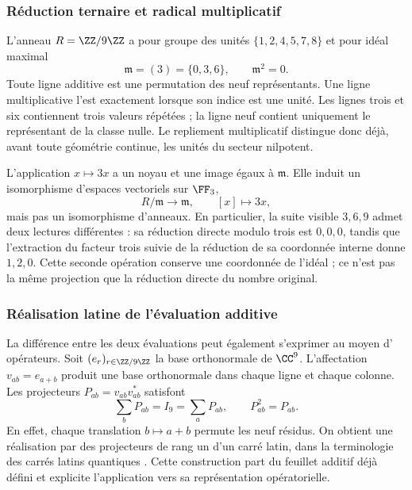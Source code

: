 \subsubsection{Réduction ternaire et radical multiplicatif}

L'anneau \(R=\ZZ/9\ZZ\) a pour groupe des unités \(\{1,2,4,5,7,8\}\) et pour idéal maximal
\[
 \mathfrak m=(3)=\{0,3,6\},\qquad\mathfrak m^2=0.
\]
Toute ligne additive est une permutation des neuf représentants. Une ligne multiplicative l'est exactement lorsque son indice est une unité. Les lignes trois et six contiennent trois valeurs répétées ; la ligne neuf contient uniquement le représentant de la classe nulle. Le repliement multiplicatif distingue donc déjà, avant toute géométrie continue, les unités du secteur nilpotent.

L'application \(x\mapsto3x\) a un noyau et une image égaux à \(\mathfrak m\). Elle induit un isomorphisme d'espaces vectoriels sur \(\FF_3\),
\[
 R/\mathfrak m\longrightarrow\mathfrak m,\qquad [x]\longmapsto3x,
\]
mais pas un isomorphisme d'anneaux. En particulier, la suite visible \(3,6,9\) admet deux lectures différentes : sa réduction directe modulo trois est \(0,0,0\), tandis que l'extraction du facteur trois suivie de la réduction de sa coordonnée interne donne \(1,2,0\). Cette seconde opération conserve une coordonnée de l'idéal ; ce n'est pas la même projection que la réduction directe du nombre original.

\subsubsection{Réalisation latine de l'évaluation additive}

La différence entre les deux évaluations peut également s'exprimer au moyen d'
opérateurs. Soit \((e_r)_{r\in\ZZ/9\ZZ}\) la base orthonormale de \(\CC^9\).
L'affectation \(v_{ab}=e_{a+b}\) produit une base orthonormale dans chaque ligne
et chaque colonne. Les projecteurs \(P_{ab}=v_{ab}v_{ab}^{*}\) satisfont
\[
 \sum_bP_{ab}=I_9=\sum_aP_{ab},\qquad P_{ab}^2=P_{ab}.
\]
En effet, chaque translation \(b\mapsto a+b\) permute les neuf résidus. On obtient une réalisation par des projecteurs de rang un d'un carré latin, dans la terminologie des carrés latins quantiques \cite{mustovicary,delascuevas2023}. Cette construction part du feuillet additif déjà défini et explicite l'application vers sa représentation opératorielle.

